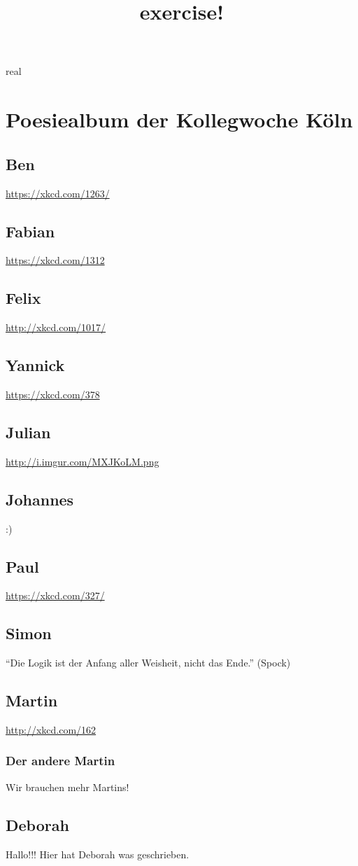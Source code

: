 real \documentclass[12pt]{scrartcl}
\begin{document}
\title{exercise!}
\maketitle
\section{Poesiealbum der Kollegwoche Köln}
\subsection{Ben}
\url{https://xkcd.com/1263/}
\subsection{Fabian}
\url{https://xkcd.com/1312}
\subsection{Felix}
\url{http://xkcd.com/1017/}
\subsection{Yannick}
\url{https://xkcd.com/378}
\subsection{Julian}
\url{http://i.imgur.com/MXJKoLM.png}
\subsection{Johannes}
:)
\subsection{Paul}
\url{https://xkcd.com/327/}

\subsection{Simon}
``Die Logik ist der Anfang aller Weisheit, nicht das Ende.'' (Spock)
\subsection{Martin}
\url{http://xkcd.com/162}
\subsubsection{Der andere Martin}
Wir brauchen mehr Martins!

\subsection{Deborah}
Hallo!!! Hier hat Deborah was geschrieben.
\end{document}
